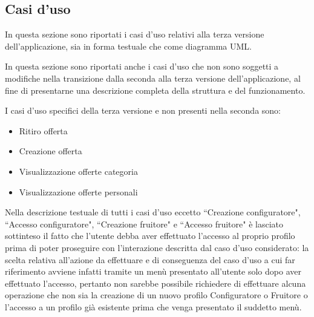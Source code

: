 \subsection{Casi d'uso}
In questa sezione sono riportati i casi d'uso relativi alla terza versione dell'applicazione, sia in forma testuale che come diagramma UML.\bigskip 

In questa sezione sono riportati anche i casi d'uso che non sono soggetti a modifiche nella transizione dalla seconda alla terza versione dell'applicazione, al fine di presentarne una descrizione completa della struttura e del funzionamento.\bigskip

I casi d'uso specifici della terza versione e non presenti nella seconda sono:
\begin{itemize}
    \item Ritiro offerta
    \item Creazione offerta
    \item Visualizzazione offerte categoria
    \item Visualizzazione offerte personali
\end{itemize} \bigskip

Nella descrizione testuale di tutti i casi d'uso eccetto ``Creazione configuratore", ``Accesso configuratore", ``Creazione fruitore" e ``Accesso fruitore" è lasciato sottinteso il fatto che l'utente debba aver effettuato l'accesso al proprio profilo prima di poter proseguire con l'interazione descritta dal caso d'uso considerato: la scelta relativa all'azione da effettuare e di conseguenza del caso d'uso a cui far riferimento avviene infatti tramite un menù presentato all'utente solo dopo aver effettuato l'accesso, pertanto non sarebbe possibile richiedere di effettuare alcuna operazione che non sia la creazione di un nuovo profilo Configuratore o Fruitore o l'accesso a un profilo già esistente prima che venga presentato il suddetto menù.\bigskip



